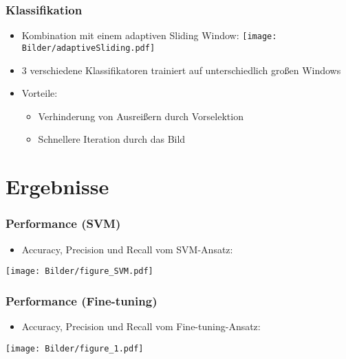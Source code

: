 \documentclass[t]{beamer}
\begin{document}
\begin{frame}
	\frametitle{Klassifikation}
	\bigskip
	\begin{itemize}
		\item Kombination mit einem adaptiven Sliding Window:
		\texttt{[image: Bilder/adaptiveSliding.pdf]}
		\item 3 verschiedene Klassifikatoren trainiert auf unterschiedlich großen Windows
		\item Vorteile:
		\begin{itemize}
			\item Verhinderung von Ausreißern durch Vorselektion
			\item Schnellere Iteration durch das Bild
		\end{itemize}
	\end{itemize}
\end{frame}



\section{Ergebnisse}

\begin{frame}
	\frametitle{Performance (SVM)}
	\begin{itemize}
	\item Accuracy, Precision und Recall vom SVM-Ansatz:
	\end{itemize}
	\texttt{[image: Bilder/figure\_SVM.pdf]}
\end{frame}

\begin{frame}
	\frametitle{Performance (Fine-tuning)}
	\begin{itemize}
	\item Accuracy, Precision und Recall vom Fine-tuning-Ansatz:
	\end{itemize}
	\texttt{[image: Bilder/figure\_1.pdf]}
\end{frame}
\end{document}
